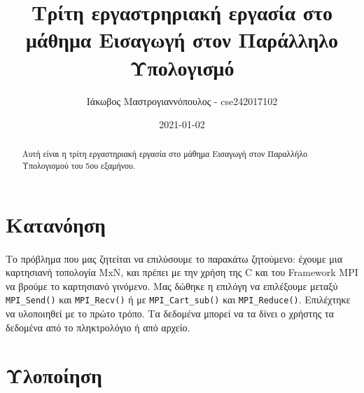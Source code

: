 \documentclass{article}
\title{Τρίτη εργαστρηριακή εργασία στο μάθημα Εισαγωγή στον Παράλληλο Υπολογισμό}
\date{2021-01-02}
\author{Ιάκωβος Μαστρογιαννόπουλος - cse242017102}
\begin{document}
    \maketitle

    \newpage
    \tableofcontents

    \newpage
    \begin{abstract}
        Αυτή είναι η τρίτη εργαστηριακή εργασία στο μάθημα Εισαγωγή στον Παραλλήλο Υπολογισμού του 5ου εξαμήνου.
    \end{abstract}

    \newpage
    \section{Κατανόηση}
    \paragraph{}
    Το πρόβλημα που μας ζητείται να επιλύσουμε το παρακάτω ζητούμενο: έχουμε μια καρτησιανή τοπολογία ΜxN, και πρέπει
    με την χρήση της C και του Framework MPI να βρούμε το καρτησιανό γινόμενο. Μας δώθηκε η επιλόγη να επιλέξουμε μεταξύ 
    \texttt{MPI\_Send()} και \texttt{MPI\_Recv()} ή με \texttt{MPI\_Cart\_sub()} και \texttt{MPI\_Reduce()}. 
    Επιλέχτηκε να υλοποιηθεί με το πρώτο τρόπο. Τα δεδομένα μπορεί να τα δίνει ο χρήστης τα δεδομένα από το πληκτρολόγιο ή
    από αρχείο.

    \section{Υλοποίηση}
    
\end{document}
